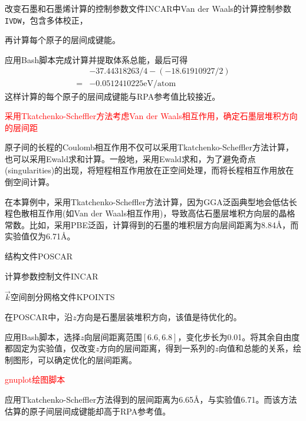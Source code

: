 {{改变石墨和石墨烯计算的控制参数文件\textrm{INCAR}中\textrm{Van der Waals}的计算控制参数\texttt{IVDW}，包含多体校正，

再计算每个原子的层间成键能。

应用\textrm{Bash}脚本完成计算并提取体系总能，最后可得
\begin{displaymath}
	\begin{aligned}
		&-37.44318263/4-(-18.61910927/2)\\
		=&-0.0512410225\mathrm{eV/atom}
	\end{aligned}
\end{displaymath}
这样计算的每个原子的层间成键能与\textrm{RPA}参考值比较接近。

\textcolor{red}{采用\textrm{Tkatchenko-Scheffler}方法考虑\textrm{Van der Waals}相互作用，确定石墨层堆积方向的层间距}

原子间的长程的\textrm{Coulomb}相互作用不仅可以采用\textrm{Tkatchenko-Scheffler}方法计算，也可以采用\textrm{Ewald}求和计算。一般地，采用\textrm{Ewald}求和，为了避免奇点\textrm{(singularities)}的出现，将短程相互作用放在正空间处理，而将长程相互作用放在倒空间计算。

在本算例中，采用\textrm{Tkatchenko-Scheffler}方法计算，因为\textrm{GGA}泛函典型地会低估长程色散相互作用(如\textrm{Van der Waals}相互作用)，导致高估石墨层堆积方向层的晶格常数。比如，采用\textrm{PBE}泛函，计算得到的石墨的堆积层方向层间距离为8.84\AA，而实验值仅为6.71\AA。

结构文件\textrm{POSCAR}

计算参数控制文件\textrm{INCAR}

$\vec k$空间剖分网格文件\textrm{KPOINTS}

在\textrm{POSCAR}中，沿$z$方向是石墨层装堆积方向，该值是待优化的。

应用\textrm{Bash}脚本，选择$z$向层间距离范围$[6.6,6.8]$，变化步长为0.01。将其余自由度都固定为实验值，仅改变$z$方向的层间距离，得到一系列的$z$向值和总能的关系，绘制图形，可以确定优化的层间距离。

\textcolor{red}{\textrm{gnuplot}绘图脚本}

应用\textrm{Tkatchenko-Scheffler}方法得到的层间距离为6.65\AA，与实验值6.71。而该方法估算的原子间层间成键能却高于\textrm{RPA}参考值。


}}
